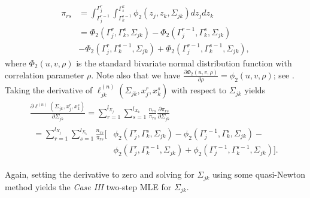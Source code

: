 \begin{equation}
    \begin{split}
        \pi_{rs} &= \int_{{\Gamma}_j^{r-1}}^{{\Gamma}_j^{r}} \int_{{\Gamma}_k^{s-1}}^{{\Gamma}^k_{s}} \phi_2(z_j,z_k,\Sigma_{jk}) dz_j dz_k \\
        &= \Phi_2({\Gamma}_j^r, {\Gamma}_k^s, \Sigma_{jk}) - \Phi_2({\Gamma}_j^{r-1}, {\Gamma}_k^s, \Sigma_{jk}) \\
        &- \Phi_2({\Gamma}_j^r, {\Gamma}_k^{s-1}, \Sigma_{jk}) + \Phi_2({\Gamma}_j^{r-1}, {\Gamma}_k^{s-1}, \Sigma_{jk}),
    \end{split}
\end{equation}
where $\Phi_2(u,v,\rho)$ is the standard bivariate normal distribution function with correlation parameter $\rho$. Note also that we have $\frac{\partial \Phi_2(u,v, \rho)}{\partial \rho} = \phi_2(u,v, \rho)$; see \citep{Tallis62}. Taking the derivative of $\ell_{jk}^{(n)}(\Sigma_{jk}, x_j^r,x_k^s)$ with respect to $\Sigma_{jk}$ yields
\begin{multline*}
    \frac{\partial \ell^{(n)}(\Sigma_{jk}, x_j^r,x_k^s)}{\partial \Sigma_{jk}} = \sum_{r=1}^{l_{X_{j}}}\sum_{s=1}^{l_{X_{k}}} \frac{n_{rs}}{\pi_{rs}} \frac{\partial \pi_{rs}}{\partial \Sigma_{jk}} \\
    \begin{aligned}
        = \sum_{r=1}^{l_{X_{j}}}\sum_{s=1}^{l_{X_{k}}} \frac{n_{rs}}{\pi_{rs}} \Big[ & \phi_2({\Gamma}_j^r, {\Gamma}_k^s, \Sigma_{jk}) - \phi_2({\Gamma}_j^{r-1}, {\Gamma}_k^s, \Sigma_{jk}) -             \\
                                                                                     & \phi_2({\Gamma}_j^r, {\Gamma}_k^{s-1}, \Sigma_{jk}) + \phi_2({\Gamma}_j^{r-1}, {\Gamma}_k^{s-1}, \Sigma_{jk})\Big].
    \end{aligned}
\end{multline*}

Again, setting the derivative to zero and solving for $\Sigma_{jk}$ using some quasi-Newton method yields the \textit{Case III} two-step MLE for $\Sigma_{jk}$.



